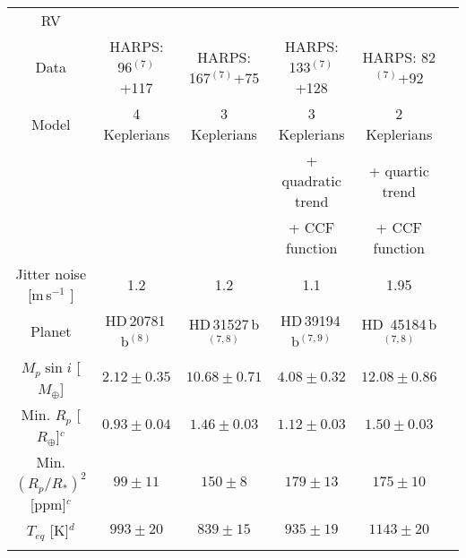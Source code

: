 \documentclass[traditabstract]{aa}
\newcommand{\ms}{\mbox{m\,s$^{-1}$} }
\begin{document}
\begin{appendix}
\begin{table*}
\begin{center}
{\begin{tabular}{cccccc}
\hline \noalign {\smallskip}
 RV      &  & & & &     \\ \noalign {\smallskip}
\hline \noalign {\smallskip}
  Data                                   & HARPS: 96$^{(7)}$+117      & HARPS: 167$^{(7)}$+75                      & HARPS: 133$^{(7)}$+128             & HARPS: 82$^{(7)}$+92 \\ \noalign {\smallskip}
  Model                                & 4 Keplerians                         & 3 Keplerians                                          &   3 Keplerians                                 & 2 Keplerians    \\ \noalign {\smallskip} 
                                            &                                               &                                                              & + quadratic trend                           & + quartic trend \\ \noalign {\smallskip}  
                                            &                                              &                                                               &  + CCF function                            & + CCF function \\ \noalign {\smallskip}  
 Jitter noise [\ms]                 &  1.2                                      &   1.2                                                        &   1.1                                                &  1.95  \\ \noalign {\smallskip} 
\hline \noalign {\smallskip}                                           
Planet                                  & HD\,20781\,b$^{(8)}$             &    HD\,31527\,b$^{(7, 8)}$              &  HD\,39194\,b$^{(7, 9)}$                  & HD\, 45184\,b$^{(7, 8)}$  \\ \noalign {\smallskip}
\hline \noalign {\smallskip}
$M_p \sin{i}$ [$M_\oplus$]    & $2.12 \pm 0.35   $               & $10.68 \pm 0.71$                      &  $4.08 \pm 0.32$                            &$12.08 \pm 0.86$ \\ \noalign {\smallskip} 
Min. $R_p$ [$R_{\oplus}$]$^c$     &  $0.93 \pm 0.04$         & $1.46 \pm 0.03$                       &   $1.12 \pm 0.03$                            & $1.50 \pm 0.03$  \\ \noalign {\smallskip} 
Min. $(R_p/R_\ast)^2$ [ppm]$^c$ & $99 \pm 11$              & $150 \pm  8$                              &  $ 179 \pm 13$                                &  $175 \pm 10$      \\ \noalign {\smallskip} 
 $T_{eq}$ [K]$^d$                  & $993 \pm 20$                     & $839 \pm 15$                           &   $935 \pm 19$                                 &   $1143 \pm 20$         \\ \noalign  {\smallskip} 

\end{tabular}}
\end{center}
\end{table*}
\end{appendix}
\end{document}
